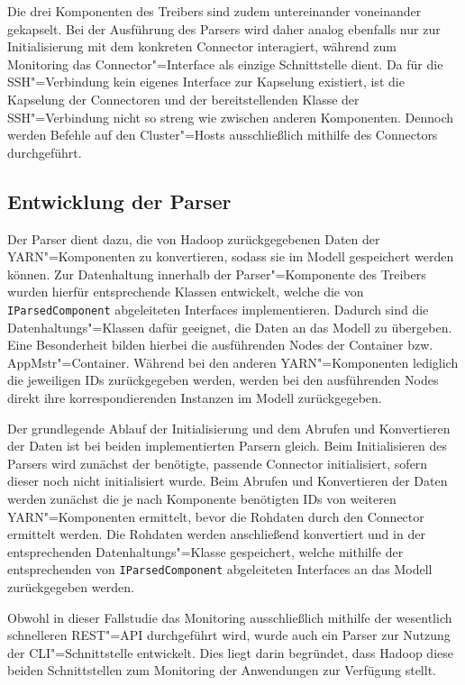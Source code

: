Die drei Komponenten des Treibers sind zudem untereinander  voneinander gekapselt.
Bei der Ausführung des Parsers wird daher analog ebenfalls nur zur Initialisierung mit dem konkreten Connector interagiert, während zum Monitoring das Connector"=Interface als einzige Schnittstelle dient.
Da für die SSH"=Verbindung kein eigenes Interface zur Kapselung existiert, ist die Kapselung der Connectoren und der bereitstellenden Klasse der SSH"=Verbindung nicht so streng wie zwischen anderen Komponenten.
Dennoch werden Befehle auf den Cluster"=Hosts ausschließlich mithilfe des Connectors durchgeführt.

\subsection{Entwicklung der Parser}
\label{subsec:implementedParsers}

Der Parser dient dazu, die von Hadoop zurückgegebenen Daten der YARN"=Komponenten zu konvertieren, sodass sie im Modell gespeichert werden können.
Zur Datenhaltung innerhalb der Parser"=Komponente des Treibers wurden hierfür entsprechende Klassen entwickelt, welche die von \texttt{IParsedComponent} abgeleiteten Interfaces implementieren.
Dadurch sind die Datenhaltungs"=Klassen dafür geeignet, die Daten an das Modell zu übergeben.
Eine Besonderheit bilden hierbei die ausführenden Nodes der Container bzw. \gls{AppMstr}"=Container.
Während bei den anderen YARN"=Komponenten lediglich die jeweiligen IDs zurückgegeben werden, werden bei den ausführenden Nodes direkt ihre korrespondierenden Instanzen im Modell zurückgegeben.

Der grundlegende Ablauf der Initialisierung und dem Abrufen und Konvertieren der Daten ist bei beiden implementierten Parsern gleich.
Beim Initialisieren des Parsers wird zunächst der benötigte, passende Connector initialisiert, sofern dieser noch nicht initialisiert wurde.
Beim Abrufen und Konvertieren der Daten werden zunächst die je nach Komponente benötigten IDs von weiteren YARN"=Komponenten ermittelt, bevor die Rohdaten durch den Connector ermittelt werden.
Die Rohdaten werden anschließend konvertiert und in der entsprechenden Datenhaltungs"=Klasse gespeichert, welche mithilfe der entsprechenden von \texttt{IParsedComponent} abgeleiteten Interfaces an das Modell zurückgegeben werden.

Obwohl in dieser Fallstudie das Monitoring ausschließlich mithilfe der wesentlich schnelleren REST"=API durchgeführt wird, wurde auch ein Parser zur Nutzung der \gls{CLI}"=Schnittstelle entwickelt.
Dies liegt darin begründet, dass Hadoop diese beiden Schnittstellen zum Monitoring der Anwendungen zur Verfügung stellt.

